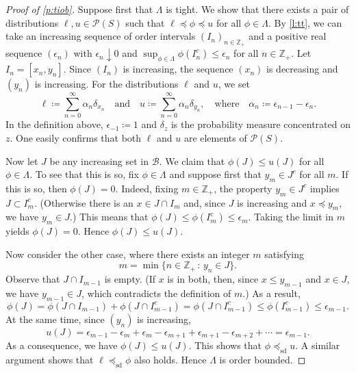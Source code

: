 \documentclass[12pt,reqno]{amsart}
\numberwithin{equation}{section}
\theoremstyle{definition}
\newcommand{\1}{\mathbbm{1}}
\newcommand{\Z}{\mathbb{Z}}
\newcommand{\bB}{\mathscr{B}}
\newcommand{\pP}{\mathscr{P}}
\newcommand{\precsd}{\preceq_{\textrm{sd}}}
\begin{document}
\begin{proof}[Proof of \cref{p:tiob}]
    Suppose first that $\Lambda$ is tight.  We show that there exists a pair of
    distributions $\ell, u \in \pP(S)$ such that $\ell \preceq \phi \preceq u$ for
    all $\phi \in \Lambda$.   By \cref{l:tt}, we can take an increasing sequence of order
    intervals $(I_n)_{n \in \Z_+}$ and a positive real sequence
    $(\epsilon_n)$ with $\epsilon_n \downarrow 0$  and $\sup_{\phi \in \Lambda} \phi(I_n^c)
    \leq \epsilon_n$ for all $n \in \Z_+$.
    Let $I_n = [x_n, y_n]$. Since $(I_n)$ is increasing, the sequence
    $(x_n)$ is decreasing and $(y_n)$ is increasing.
    For the distributions $\ell$ and $u$, we set
    \begin{equation*}
        \ell \coloneq \sum_{n=0}^\infty \alpha_n \delta_{x_n}
        \quad \text{and} \quad
        u \coloneq \sum_{n=0}^\infty \alpha_n \delta_{y_n},
        \quad \text{where} \quad
        \alpha_n \coloneq \epsilon_{n-1} - \epsilon_n.
    \end{equation*}
    In the definition above, $\epsilon_{-1} \coloneq 1$ and $\delta_z$ is the
    probability measure concentrated on $z$.  One easily confirms that both
    $\ell$ and $u$ are elements of $\pP(S)$.

    Now let $J$ be any increasing set in $\bB$. We claim that $\phi(J) \leq u(J)$ for all
    $\phi \in \Lambda$.  To see that this is so, fix $\phi \in \Lambda$ and suppose
    first that $y_m \in J^c$ for all $m$.  If this is so, then $\phi(J) = 0$.
    Indeed, fixing $m \in \Z_+$, the property $y_m \in J^c$ implies $J \subset
    I^c_m$. (Otherwise there is an $x \in J \cap I_m$ and, since $J$ is
    increasing and $x \preceq y_m$, we have $y_m \in J$.)  This means
    that $\phi(J) \leq \phi (I^c_m) \leq \epsilon_m$.  Taking the limit in $m$
    yields $\phi(J) = 0$.  Hence $\phi(J) \leq u(J)$.

    Now consider the other case, where there exists an integer $m$ satisfying
    \begin{equation*}
        m = \min\{n \in \Z_+ \, : \, y_n \in J\}.
    \end{equation*}
    Observe that $J \cap I_{m-1}$ is empty. (If $x$ is in both, then,
    since $x \leq y_{m-1}$ and $x \in J$, we have $y_{m-1} \in J$, which
    contradicts the definition of $m$.)  As a result,
    \begin{equation*}
        \phi(J)
        = \phi(J \cap I_{m-1}) + \phi(J \cap I^c_{m-1})
        = \phi(J \cap I^c_{m-1})
        \leq \phi(I^c_{m-1})
        \leq \epsilon_{m-1}.
    \end{equation*}
    At the same time, since $(y_n)$ is increasing,
    \begin{equation*}
        u(J)
        = \epsilon_{m-1} - \epsilon_m
            + \epsilon_m - \epsilon_{m+1}
            + \epsilon_{m+1} - \epsilon_{m+2}
            + \cdots
        = \epsilon_{m-1}.
    \end{equation*}
    As a consequence, we have $\phi(J) \leq u(J)$.  This shows that $\phi
    \precsd u$.  A similar argument shows that $\ell \precsd \phi$ also holds.
    Hence $\Lambda$ is order bounded.


\end{proof}
\end{document}
